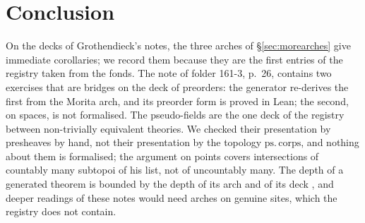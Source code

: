 \section{Conclusion}\label{sec:nconclusion}

On the decks of Grothendieck's notes, the three arches of \S\ref{sec:morearches} give immediate corollaries; we record them because they are the first entries of the registry taken from the fonds. The note of folder 161-3, p.~26, contains two exercises that are bridges on the deck of preorders: the generator re-derives the first from the Morita arch, and its preorder form is proved in Lean; the second, on spaces, is not formalised. The pseudo-fields are the one deck of the registry between non-trivially equivalent theories. We checked their presentation by presheaves by hand, not their presentation by the topology $\mathrm{ps.\,corps}$, and nothing about them is formalised; the argument on points covers intersections of countably many subtopoi of his list, not of uncountably many. The depth of a generated theorem is bounded by the depth of its arch and of its deck \cite[slide 8]{caramello-mines}, and deeper readings of these notes would need arches on genuine sites, which the registry does not contain.
